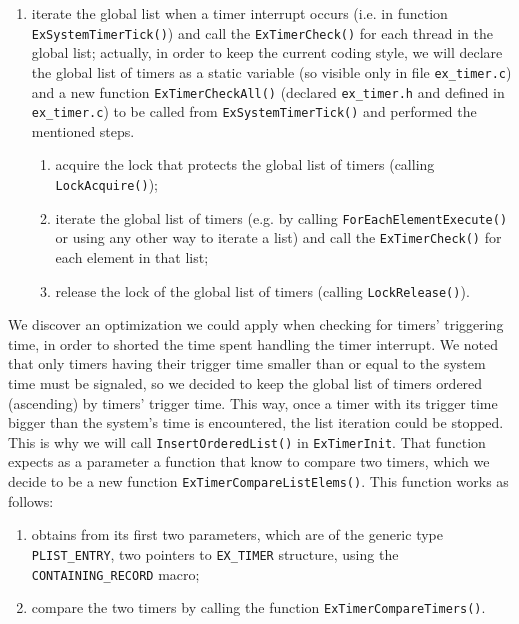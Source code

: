 \begin{enumerate}
        
    \item iterate the global list when a timer interrupt occurs (i.e. in function \lstinline|ExSystemTimerTick()|) and call the \lstinline|ExTimerCheck()| for each thread in the global list; actually, in order to keep the current coding style, we will declare the global list of timers as a static variable (so visible only in file \lstinline|ex_timer.c|) and a new function \lstinline|ExTimerCheckAll()| (declared \lstinline|ex_timer.h| and defined in \lstinline|ex_timer.c|) to be called from \lstinline|ExSystemTimerTick()| and performed the mentioned steps.
        \begin{enumerate}
            \item acquire the lock that protects the global list of timers (calling \lstinline|LockAcquire()|);
            
            \item iterate the global list of timers (e.g. by calling \lstinline|ForEachElementExecute()| or using any other way to iterate a list) and call the \lstinline|ExTimerCheck()| for each element in that list;
            
            \item release the lock of the global list of timers (calling \lstinline|LockRelease()|).
        \end{enumerate}

\end{enumerate}

We discover an optimization we could apply when checking for timers' triggering time, in order to shorted the time spent handling the timer interrupt. We noted that only timers having their trigger time smaller than or equal to the system time must be signaled, so we decided to keep the global list of timers ordered (ascending) by timers' trigger time. This way, once a timer with its trigger time bigger than the system's time is encountered, the list iteration could be stopped. This is why we will call \lstinline|InsertOrderedList()| in  \lstinline|ExTimerInit|. That function expects as a parameter a function that know to compare two timers, which we decide to be a new function \lstinline|ExTimerCompareListElems()|. This function works as follows:
\begin{enumerate}
    \item obtains from its first two parameters, which are of the generic type \lstinline|PLIST_ENTRY|, two pointers to \lstinline|EX_TIMER| structure, using the \lstinline|CONTAINING_RECORD| macro;
    
    \item compare the two timers by calling the function \lstinline|ExTimerCompareTimers()|.
\end{enumerate}

